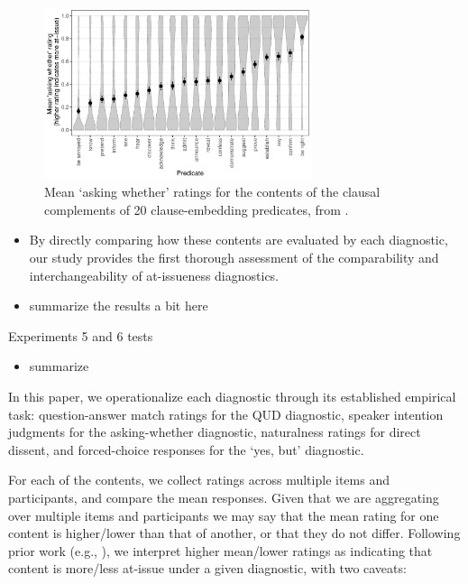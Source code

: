 \documentclass[times,linguex,xcolor]{glossa}
\begin{document}
  \begin{figure}[h!]
    \centering

    \includegraphics[width=0.7\textwidth]{../../results/degen-tonhauser-glossa/graphs/mean-asking-whether-ratings.pdf}

    \caption{Mean `asking whether' ratings for the contents of the clausal complements of 20 clause-embedding predicates, from \citealt{degen-tonhauser-glossa}.}
    \label{fig:dtglossa}
  \end{figure}

  \begin{itemize}
    \item By directly comparing how these contents are evaluated by each diagnostic, our study provides the first thorough assessment of the comparability and interchangeability of at-issueness diagnostics.
    \item summarize the results a bit here
  \end{itemize}

  Experiments 5 and 6 tests 
  \begin{itemize}
    \item summarize
  \end{itemize}

  

  In this paper, we operationalize each diagnostic through its established empirical task: question-answer match ratings for the QUD diagnostic, speaker intention judgments for the asking-whether diagnostic, naturalness ratings for direct dissent, and forced-choice responses for the ‘yes, but’ diagnostic.

  For each of the contents, we collect ratings across multiple items and participants, and compare the mean responses. Given that we are aggregating over multiple items and participants
  we may say that the mean rating for one content is higher/lower than that of another, or that they do not differ. Following prior work (e.g., \citealt{tonhauser_how_2018}), we interpret higher mean/lower ratings as indicating that content is more/less at-issue under a given diagnostic, with two caveats:
\end{document}
